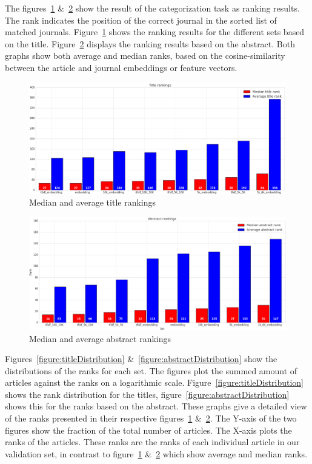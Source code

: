 \documentclass[../../Thesis.tex]{subfiles}
\begin{document}
The figures~\ref{figure:titleRanks} \&~\ref{figure:abstractRanks} show the result of the categorization task as ranking results. The rank indicates the position of the correct journal in the sorted list of matched journals. Figure~\ref{figure:titleRanks} shows the ranking results for the different sets based on the title. Figure~\ref{figure:abstractRanks} displays the ranking results based on the abstract. Both graphs show both average and median ranks, based on the cosine-similarity between the article and journal embeddings or feature vectors.\\
\begin{figure}[hbt]
\includegraphics[width=6.5in]{Plots/Title_rankings}
\caption{Median and average title rankings}\label{figure:titleRanks}
\end{figure}
\begin{figure}[hbt]
\includegraphics[width=6.5in]{Plots/Abstract_rankings}
\caption{Median and average abstract rankings}\label{figure:abstractRanks}
\end{figure}
\clearpage
{}
Figures~\ref{figure:titleDistribution} \&~\ref{figure:abstractDistribution} show the distributions of the ranks for each set. The figures plot the summed amount of articles against the ranks on a logarithmic scale. Figure~\ref{figure:titleDistribution} shows the rank distribution for the titles, figure~\ref{figure:abstractDistribution} shows this for the ranks based on the abstract. These graphs give a detailed view of the ranks presented in their respective figures~\ref{figure:titleRanks} \&~\ref{figure:abstractRanks}. The Y-axis of the two figures show the fraction of the total number of articles. The X-axis plots the ranks of the articles. These ranks are the ranks of each individual article in our validation set, in contrast to figure~\ref{figure:titleRanks} \&~\ref{figure:abstractRanks} which show average and median ranks.
\end{document}
